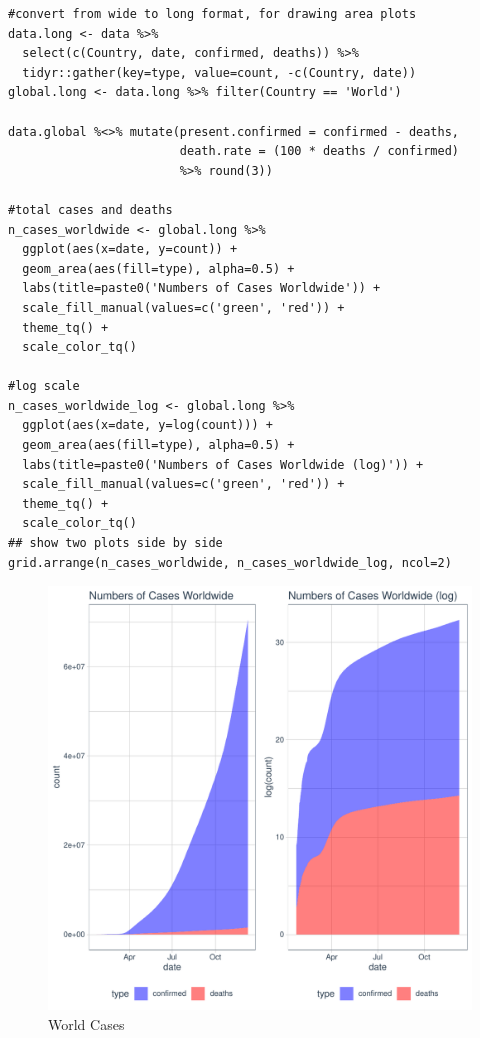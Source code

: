 \begin{verbatim}
#convert from wide to long format, for drawing area plots
data.long <- data %>%
  select(c(Country, date, confirmed, deaths)) %>%
  tidyr::gather(key=type, value=count, -c(Country, date))
global.long <- data.long %>% filter(Country == 'World')

data.global %<>% mutate(present.confirmed = confirmed - deaths,
                        death.rate = (100 * deaths / confirmed) 
                        %>% round(3))

#total cases and deaths
n_cases_worldwide <- global.long %>%
  ggplot(aes(x=date, y=count)) +
  geom_area(aes(fill=type), alpha=0.5) +
  labs(title=paste0('Numbers of Cases Worldwide')) +
  scale_fill_manual(values=c('green', 'red')) +
  theme_tq() + 
  scale_color_tq()

#log scale
n_cases_worldwide_log <- global.long %>%
  ggplot(aes(x=date, y=log(count))) +
  geom_area(aes(fill=type), alpha=0.5) +
  labs(title=paste0('Numbers of Cases Worldwide (log)')) +
  scale_fill_manual(values=c('green', 'red')) +
  theme_tq() + 
  scale_color_tq()
## show two plots side by side
grid.arrange(n_cases_worldwide, n_cases_worldwide_log, ncol=2)
\end{verbatim}
\newpage
\begin{figure}[h!]
    \centering
    \includegraphics[width=\linewidth]{images/word_cases.pdf}
    \caption{World Cases}
    \label{fig:world_cases}
\end{figure}

